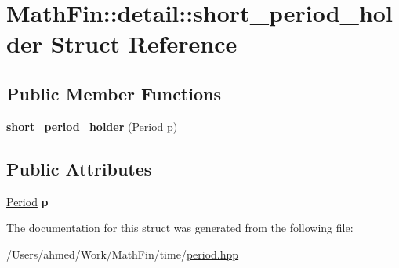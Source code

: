 \hypertarget{struct_math_fin_1_1detail_1_1short__period__holder}{}\section{Math\+Fin\+:\+:detail\+:\+:short\+\_\+period\+\_\+holder Struct Reference}
\label{struct_math_fin_1_1detail_1_1short__period__holder}
\subsection*{Public Member Functions}
\begin{DoxyCompactItemize}
\item 
\hypertarget{struct_math_fin_1_1detail_1_1short__period__holder_ac8935c66b119782997f54ecb87a5e0f8}{}{\bfseries short\+\_\+period\+\_\+holder} (\hyperlink{class_math_fin_1_1_period}{Period} p)\label{struct_math_fin_1_1detail_1_1short__period__holder_ac8935c66b119782997f54ecb87a5e0f8}

\end{DoxyCompactItemize}
\subsection*{Public Attributes}
\begin{DoxyCompactItemize}
\item 
\hypertarget{struct_math_fin_1_1detail_1_1short__period__holder_a6e2e3b12db3bc53b6b1967ec6ff496d2}{}\hyperlink{class_math_fin_1_1_period}{Period} {\bfseries p}\label{struct_math_fin_1_1detail_1_1short__period__holder_a6e2e3b12db3bc53b6b1967ec6ff496d2}

\end{DoxyCompactItemize}


The documentation for this struct was generated from the following file\+:\begin{DoxyCompactItemize}
\item 
/\+Users/ahmed/\+Work/\+Math\+Fin/time/\hyperlink{period_8hpp}{period.\+hpp}\end{DoxyCompactItemize}
